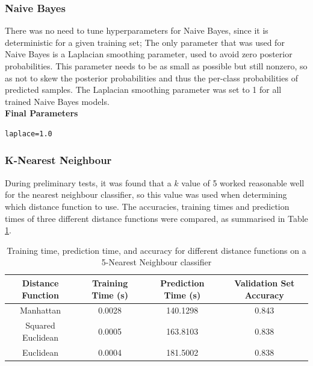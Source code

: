 \documentclass[11pt,a4paper]{article}
\begin{document}
\subsubsection*{Naive Bayes}

\noindent There was no need to tune hyperparameters for Naive Bayes, since it is deterministic for a given training set; The only parameter that was used for Naive Bayes is a Laplacian smoothing parameter, used to avoid zero posterior probabilities. This parameter needs to be as small as possible but still nonzero, so as not to skew the posterior probabilities and thus the per-class probabilities of predicted samples. The Laplacian smoothing parameter was set to 1 for all trained Naive Bayes models.\\

\noindent \textbf{Final Parameters}
\begin{verbatim}
laplace=1.0
\end{verbatim}

\subsubsection*{K-Nearest Neighbour}

\noindent During preliminary tests, it was found that a $k$ value of 5 worked reasonable well for the nearest neighbour classifier, so this value was used when determining which distance function to use. The accuracies, training times and prediction times of three different distance functions were compared, as summarised in Table \ref{table:knn_dist_funcs}.

\begin{table}[H]
\centering
\begin{tabular}{|c|c c c|} 
\hline
Distance Function & Training Time (s) & Prediction Time (s) & Validation Set Accuracy \\ [0.5ex] 
\hline
Manhattan & 0.0028 & 140.1298 & 0.843 \\ 
Squared Euclidean & 0.0005 & 163.8103 & 0.838 \\
Euclidean & 0.0004 & 181.5002 & 0.838 \\ [1ex] 
\hline
\end{tabular}
\caption{Training time, prediction time, and accuracy for different distance functions on a 5-Nearest Neighbour classifier}
\label{table:knn_dist_funcs}
\end{table}
\end{document}
